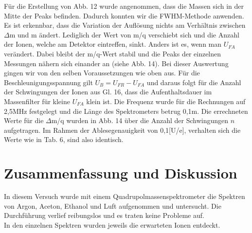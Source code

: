 Für die Erstellung von Abb. 12 wurde angenommen, dass die Massen sich in der Mitte der Peaks befinden. Dadurch konnten wir die FWHM-Methode anwenden. Es ist erkennbar, dass die Variation der Auflösung nichts am Verhältnis zwischen $\Delta$m und m ändert. Lediglich der Wert von m/q verschiebt sich und die Anzahl der Ionen, welche am Detektor eintreffen, sinkt. Anders ist es, wenn man $U_{FA}$ verändert. Dabei bleibt der m/q-Wert stabil und die Peaks der einzelnen Messungen nähern sich einander an (siehe Abb. 14). Bei dieser Auswertung gingen wir von den selben Voraussetzungen wie oben  aus. Für die Beschleunigungsspannung gilt $U_{B} = U_{FR}-U_{FA}$ und daraus folgt für die Anzahl der Schwingungen der Ionen aus Gl. 16, dass die Aufenthaltsdauer im Massenfilter für kleine $U_{FA}$ klein ist. Die Frequenz wurde für die Rechnungen auf 2,5MHz festgelegt und die Länge des Spektrometers betrug 0,1m. Die errechneten Werte für die $\Delta$m/q wurden in Abb. 14 über die Anzahl der Schwingungen $n$ aufgetragen. Im Rahmen der Ablesegenauigkeit von 0,1[U/e], verhalten sich die Werte wie in Tab. 6, sind also identisch.
  

\newpage
\section{Zusammenfassung und Diskussion}
In diesem Versuch wurde mit einem Quadrupolmassenspektrometer die Spektren von Argon, Aceton, Ethanol und Luft aufgenommen und untersucht. Die Durchführung verlief reibungslos und es traten keine Probleme auf.\\
In den einzelnen Spektren wurden jeweils die erwarteten Ionen entdeckt.